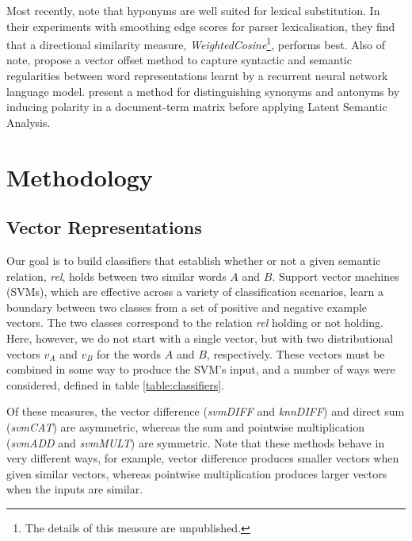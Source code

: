 \documentclass[11pt]{article}
\begin{document}
Most recently,  note that hyponyms are well suited for lexical substitution.  In their experiments with smoothing edge scores for parser lexicalisation, they find that a directional similarity measure,  \emph{WeightedCosine}\footnote{The details of this measure are unpublished.}, performs best. Also of note,  propose a vector offset method to capture syntactic and semantic regularities between word representations learnt by a recurrent neural network language model.   present a method for distinguishing synonyms and antonyms by inducing polarity in a document-term matrix before applying Latent Semantic Analysis.


\section{Methodology}

\subsection{Vector Representations}
\label{sect:representations}

Our goal is to build classifiers that establish whether or not a given
semantic relation, \emph{rel}, holds between two similar words $A$ and
$B$.  Support vector machines (SVMs), which are effective across a
variety of classification scenarios, learn a boundary between two
classes from a set of positive and negative example vectors.  The two
classes correspond to the relation \emph{rel} holding or not holding.
Here, however, we do not start with a single vector, but with two
distributional vectors $v_A$ and $v_B$ for the words $A$ and $B$,
respectively. These vectors must be combined in some way to produce
the SVM's input, and a number of ways were considered, defined in
table \ref{table:classifiers}.

Of these measures, the vector difference (\emph{svm\-DIFF} and
\emph{knnDIFF}) and direct sum (\emph{svmCAT}) are asymmetric, whereas
the sum and pointwise multiplication (\emph{svmADD} and \emph{svmMULT})
are symmetric. Note that these methods behave in very different ways,
for example, vector difference produces smaller vectors when given
similar vectors, whereas pointwise multiplication produces larger
vectors when the inputs are similar.

\end{document}
